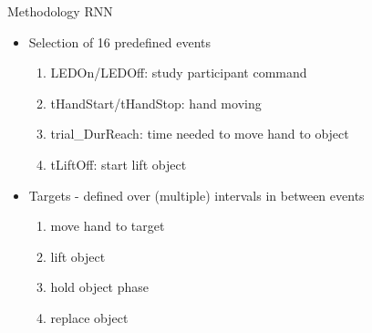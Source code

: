 \documentclass{beamer}
\begin{document}
\begin{frame}{Methodology RNN}
{\begin{itemize}
                    \item Selection of 16 predefined events
                    \begin{enumerate}
                        \item LEDOn/LEDOff: study participant command
                        \item tHandStart/tHandStop: hand moving
                        \item trial\_DurReach: time needed to move hand to object
                        \item tLiftOff: start lift object
                    \end{enumerate}
                 
                    \item Targets - defined over (multiple) intervals in between events
                    \begin{enumerate}
                    \item move hand to target
                        \item lift object
                        \item hold object phase
                        \item replace object
                    \end{enumerate}

                \end{itemize}

        }
\end{frame}
\end{document}
